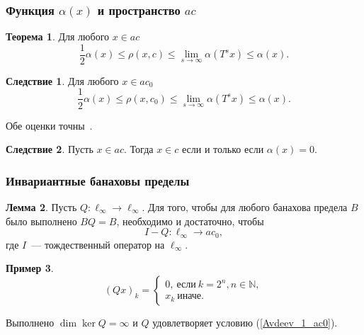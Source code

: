 \documentclass[10pt,pdf,hyperref={unicode}]{beamer}
\theoremstyle{definition}
\newtheorem{llemma}{Лемма}
\newtheorem{ttheorem}[llemma]{Теорема}
\newtheorem{eexample}[llemma]{Пример}
\newtheorem{ccorollary}{Следствие}[llemma]
\begin{document}
\begin{frame}
	\frametitle{Функция $\alpha(x)$ и пространство $ac$~\cite{our-mz2019ac0}}
	\begin{ttheorem}
		Для любого $x\in ac$
		\begin{equation*}
			\frac{1}{2} \alpha(x) \leq \rho(x,c)\leq \lim_{s\to\infty} \alpha(T^s x) \leq \alpha(x)
			.
		\end{equation*}
	\end{ttheorem}

	\begin{ccorollary}
		Для любого $x\in ac_0$
		\begin{equation*}
			\frac{1}{2} \alpha(x) \leq \rho(x,c_0)\leq \lim_{s\to\infty} \alpha(T^s x) \leq \alpha(x)
			.
		\end{equation*}
	\end{ccorollary}

	Обе оценки точны~\cite{our-ped-2018-alpha-Tx}.

	\begin{ccorollary}
		Пусть $x\in ac$.
		Тогда $x\in c$ если и только если $\alpha(x) = 0$.
	\end{ccorollary}

\end{frame}


\begin{frame}
	\frametitle{Инвариантные банаховы пределы~\cite{our-ped-2018-inf-dim-ker}}
	\begin{llemma}
		Пусть $Q:\ell_\infty \to \ell_\infty$.
		Для того, чтобы для любого банахова предела $B$
		было выполнено $BQ = B$,
		необходимо и достаточно, чтобы
		\begin{equation}\label{Avdeev_1_ac0}
			I-Q : \ell_\infty \to ac_0,
		\end{equation}
		где $I$~--- тождественный оператор на $\ell_\infty$.
	\end{llemma}

	\begin{eexample}
		\begin{equation*}
			(Qx)_k =
			\begin{cases}
				0,~\mbox{если}~ k = 2^n, n \in\mathbb{N},
				\\
				x_k~\mbox{иначе.}
			\end{cases}
		\end{equation*}

		Выполнено $\dim \ker Q = \infty$ и $Q$ удовлетворяет условию (\ref{Avdeev_1_ac0}).
	\end{eexample}


\end{frame}
\end{document}
